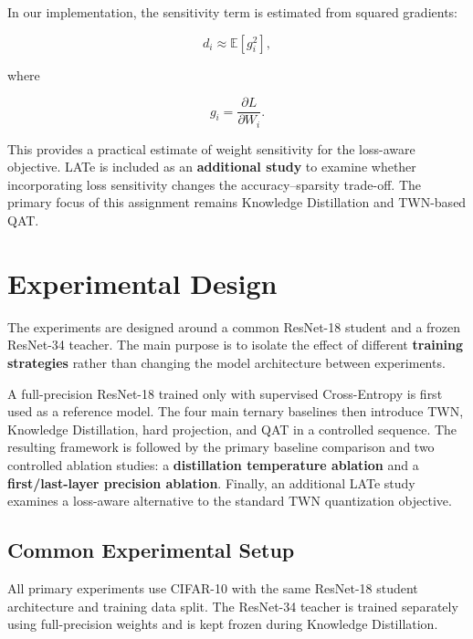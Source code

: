 \documentclass[conference]{IEEEtran}
\begin{document}
In our implementation, the sensitivity term is estimated from squared
gradients:

\begin{equation}
d_i \approx \mathbb{E}[g_i^2],
\end{equation}

where

\begin{equation}
g_i =
\frac{\partial L}{\partial W_i}.
\end{equation}

This provides a practical estimate of weight sensitivity for the
loss-aware objective. LATe is included as an \textbf{additional study}
to examine whether incorporating loss sensitivity changes the
accuracy--sparsity trade-off. The primary focus of this assignment
remains Knowledge Distillation and TWN-based QAT.


\section{Experimental Design}

The experiments are designed around a common ResNet-18 student and a
frozen ResNet-34 teacher. The main purpose is to isolate the effect of
different \textbf{training strategies} rather than changing the model
architecture between experiments.

A full-precision ResNet-18 trained only with supervised
Cross-Entropy is first used as a reference model. The four main
ternary baselines then introduce TWN, Knowledge Distillation, hard
projection, and QAT in a controlled sequence. The resulting framework
is followed by the primary baseline comparison and two controlled
ablation studies: a \textbf{distillation temperature ablation} and
a \textbf{first/last-layer precision ablation}. Finally, an additional
LATe study examines a loss-aware alternative to the standard TWN
quantization objective.

\subsection{Common Experimental Setup}

All primary experiments use CIFAR-10 with the same ResNet-18 student
architecture and training data split. The ResNet-34 teacher is trained
separately using full-precision weights and is kept frozen during
Knowledge Distillation.
\end{document}
